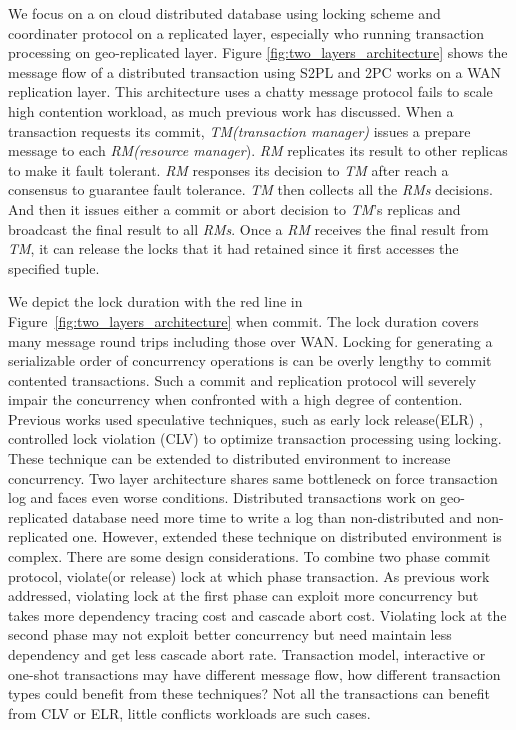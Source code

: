 \documentclass[conference]{IEEEtran}
\begin{document}
We focus on a on cloud distributed database using locking scheme and coordinater protocol on a replicated layer, especially who running transaction processing on geo-replicated layer.
Figure \ref{fig:two_layers_architecture} shows the message flow of a distributed transaction using S2PL and 2PC works on a WAN replication layer.
This architecture uses a chatty message protocol fails to scale high contention workload, as much previous work has discussed.
When a transaction requests its commit, \emph{TM(transaction manager)}  issues a prepare message to each \emph{RM(resource manager}).
\emph{RM} replicates its result to other replicas to make it fault tolerant.
\emph{RM} responses its decision to \emph{TM} after reach a consensus to guarantee fault tolerance. 
\emph{TM} then collects all the \emph{RMs} decisions.
And then it issues either a commit or abort decision to \emph{TM}'s replicas and
broadcast the final result to all \emph{RMs}.
Once a \emph{RM} receives the final result from \emph{TM}, it can release the locks that it had retained since it first accesses the specified tuple.


We depict the lock duration with the red line in Figure~\ref{fig:two_layers_architecture} when commit.
The lock duration covers many message round trips including those over WAN.
Locking for generating a serializable order of concurrency operations is can be overly lengthy to commit contented transactions. 
Such a commit and replication protocol will severely impair the concurrency when confronted with a high degree of contention.
Previous works used speculative techniques, such as early lock release(ELR) \cite{EfficientLocking:conf/vldb/KimuraGK12}, controlled lock violation (CLV)\cite{CLV:conf/sigmod/GraefeLKTV13} to optimize transaction processing using locking.
These technique can be extended to distributed environment to increase concurrency.
Two layer architecture shares same bottleneck on force transaction log and faces even worse conditions.
Distributed transactions work on geo-replicated database need more time to write a log than non-distributed and non-replicated one.
However, extended these technique on distributed environment is complex.
There are some design considerations.
To combine two phase commit protocol, violate(or release) lock at which phase transaction.
As previous work addressed\cite{CLV:conf/sigmod/GraefeLKTV13}, violating lock at the first phase can exploit more concurrency but takes more dependency tracing cost and cascade abort cost.
Violating lock at the second phase may not exploit better concurrency but need maintain less dependency and get less cascade abort rate.
Transaction model, interactive or one-shot transactions may have different message flow, how different transaction types could benefit from these techniques?
Not all the transactions can benefit from CLV or ELR, little conflicts workloads are such cases.
\end{document}
